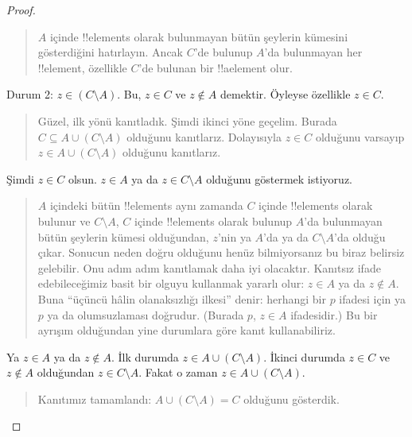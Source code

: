 \begin{proof}
\begin{quote}
    $A$ içinde !!{element}s olarak bulunmayan bütün şeylerin kümesini
    gösterdiğini hatırlayın. Ancak $C$'de bulunup $A$'da bulunmayan her
    !!{element}, özellikle $C$'de bulunan bir !!a{element} olur.
  \end{quote}
  Durum 2: $z \in (C \setminus A)$. Bu, $z \in C$ ve $z \notin A$
  demektir. Öyleyse özellikle $z \in C$.
  \begin{quote}
    Güzel, ilk yönü kanıtladık. Şimdi ikinci yöne geçelim. Burada $C
    \subseteq A \cup (C \setminus A)$ olduğunu kanıtlarız. Dolayısıyla
    $z \in C$ olduğunu varsayıp $z \in A \cup (C \setminus A)$ olduğunu
    kanıtlarız.
  \end{quote}
  Şimdi $z \in C$ olsun. $z \in A$ ya da $z \in C \setminus A$
  olduğunu göstermek istiyoruz.
  \begin{quote}
    $A$ içindeki bütün !!{element}s aynı zamanda $C$ içinde !!{element}s
    olarak bulunur ve $C \setminus A$, $C$ içinde !!{element}s olarak bulunup $A$'da bulunmayan
    bütün şeylerin kümesi olduğundan, $z$'nin ya $A$'da ya da $C
    \setminus A$'da olduğu çıkar. Sonucun neden doğru olduğunu henüz
    bilmiyorsanız bu biraz belirsiz gelebilir. Onu adım adım kanıtlamak
    daha iyi olacaktır. Kanıtsız ifade edebileceğimiz basit bir olguyu
    kullanmak yararlı olur: $z \in A$ ya da $z \notin A$. Buna
    ``üçüncü hâlin olanaksızlığı ilkesi'' denir: herhangi bir $p$
    ifadesi için ya $p$ ya da olumsuzlaması doğrudur. (Burada $p$, $z
    \in A$ ifadesidir.) Bu bir ayrışım olduğundan yine durumlara göre
    kanıt kullanabiliriz.
  \end{quote}
  Ya $z \in A$ ya da $z \notin A$. İlk durumda $z \in A \cup (C
  \setminus A)$. İkinci durumda $z \in C$ ve $z \notin A$ olduğundan
  $z \in C \setminus A$. Fakat o zaman $z \in A \cup (C \setminus A)$.
  \begin{quote}
    Kanıtımız tamamlandı: $A \cup (C \setminus A) = C$ olduğunu gösterdik.
  \end{quote}
\end{proof}

